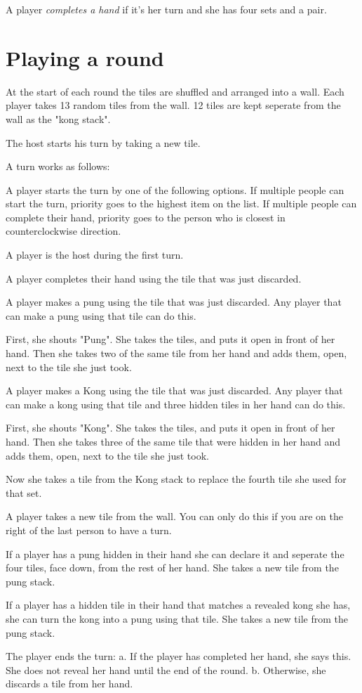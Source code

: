 \documentclass{article}
\begin{document}
A player \emph{completes a hand} if it's her turn and she has four sets and a pair.

\section{Playing a round}
At the start of each round the tiles are shuffled and arranged into a wall. Each player takes 13 random tiles from the wall. 12 tiles are kept seperate from the wall as the "kong stack".

The host starts his turn by taking a new tile.

A turn works as follows:
\begin{enumerate*}
    \item A player starts the turn by one of the following options. If multiple people can start the turn, priority goes to the highest item on the list. If multiple people can complete their hand, priority goes to the person who is closest in counterclockwise direction.
    \begin{enumerate*}
        \item A player is the host during the first turn.
        \item A player completes their hand using the tile that was just discarded.
        \item A player makes a pung using the tile that was just discarded. Any player that can make a pung using that tile can do this.

        First, she shouts "Pung". She takes the tiles, and puts it open in front of her hand. Then she takes two of the same tile from her hand and adds them, open, next to the tile she just took.
        \item A player makes a Kong using the tile that was just discarded. Any player that can make a kong using that tile and three hidden tiles in her hand can do this.

        First, she shouts "Kong". She takes the tiles, and puts it open in front of her hand. Then she takes three of the same tile that were hidden in her hand and adds them, open, next to the tile she just took.

        Now she takes a tile from the Kong stack to replace the fourth tile she used for that set.
        \item A player takes a new tile from the wall. You can only do this if you are on the right of the last person to have a turn.
    \end{enumerate*}
    \item If a player has a pung hidden in their hand she can declare it and seperate the four tiles, face down, from the rest of her hand. She takes a new tile from the pung stack.
    \item If a player has a hidden tile in their hand that matches a revealed kong she has, she can turn the kong into a pung using that tile. She takes a new tile from the pung stack.
    \item The player ends the turn:
   a. If the player has completed her hand, she says this. She does not reveal her hand until the end of the round.
   b. Otherwise, she discards a tile from her hand.
\end{enumerate*}
\end{document}
